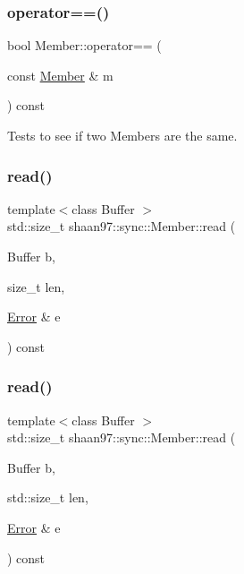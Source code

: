 \mbox{\label{classshaan97_1_1sync_1_1_member_ae7e47ef4b175dfc44e396ae7ede465e0}} 
\subsubsection{\texorpdfstring{operator==()}{operator==()}}
{\footnotesize\ttfamily bool Member\+::operator== (\begin{DoxyParamCaption}\item[{const \hyperlink{classshaan97_1_1sync_1_1_member}{Member} \&}]{m }\end{DoxyParamCaption}) const}



Tests to see if two Members are the same. 

\mbox{\label{classshaan97_1_1sync_1_1_member_a58a9c4dad0338a4101ed36ee710ed8f2}} 
\subsubsection{\texorpdfstring{read()}{read()}\hspace{0.1cm}{\footnotesize\ttfamily [1/3]}}
{\footnotesize\ttfamily template$<$class Buffer $>$ \\
std\+::size\+\_\+t shaan97\+::sync\+::\+Member\+::read (\begin{DoxyParamCaption}\item[{Buffer}]{b,  }\item[{size\+\_\+t}]{len,  }\item[{\hyperlink{classshaan97_1_1sync_1_1_error}{Error} \&}]{e }\end{DoxyParamCaption}) const}

\mbox{\label{classshaan97_1_1sync_1_1_member_a258cd0c6ae7617ce17f7a36e78b95b85}} 
\subsubsection{\texorpdfstring{read()}{read()}\hspace{0.1cm}{\footnotesize\ttfamily [2/3]}}
{\footnotesize\ttfamily template$<$class Buffer $>$ \\
std\+::size\+\_\+t shaan97\+::sync\+::\+Member\+::read (\begin{DoxyParamCaption}\item[{Buffer}]{b,  }\item[{std\+::size\+\_\+t}]{len,  }\item[{\hyperlink{classshaan97_1_1sync_1_1_error}{Error} \&}]{e }\end{DoxyParamCaption}) const}

